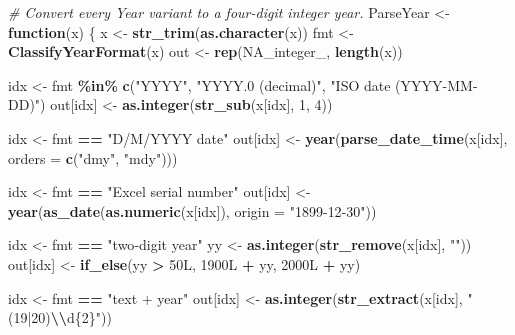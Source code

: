 \documentclass[
]{article}
\newenvironment{Shaded}{\begin{snugshade}}{\end{snugshade}}
\newcommand{\AttributeTok}[1]{\textcolor[rgb]{0.13,0.29,0.53}{#1}}
\newcommand{\CommentTok}[1]{\textcolor[rgb]{0.56,0.35,0.01}{\textit{#1}}}
\newcommand{\ConstantTok}[1]{\textcolor[rgb]{0.56,0.35,0.01}{#1}}
\newcommand{\ControlFlowTok}[1]{\textcolor[rgb]{0.13,0.29,0.53}{\textbf{#1}}}
\newcommand{\DataTypeTok}[1]{\textcolor[rgb]{0.13,0.29,0.53}{#1}}
\newcommand{\DecValTok}[1]{\textcolor[rgb]{0.00,0.00,0.81}{#1}}
\newcommand{\FunctionTok}[1]{\textcolor[rgb]{0.13,0.29,0.53}{\textbf{#1}}}
\newcommand{\NormalTok}[1]{#1}
\newcommand{\OtherTok}[1]{\textcolor[rgb]{0.56,0.35,0.01}{#1}}
\newcommand{\SpecialCharTok}[1]{\textcolor[rgb]{0.81,0.36,0.00}{\textbf{#1}}}
\newcommand{\StringTok}[1]{\textcolor[rgb]{0.31,0.60,0.02}{#1}}
\begin{document}
\begin{Shaded}
\begin{Highlighting}[]
\CommentTok{\# Convert every Year variant to a four{-}digit integer year.}
\NormalTok{ParseYear }\OtherTok{\textless{}{-}} \ControlFlowTok{function}\NormalTok{(x) \{}
\NormalTok{  x }\OtherTok{\textless{}{-}} \FunctionTok{str\_trim}\NormalTok{(}\FunctionTok{as.character}\NormalTok{(x))}
\NormalTok{  fmt }\OtherTok{\textless{}{-}} \FunctionTok{ClassifyYearFormat}\NormalTok{(x)}
\NormalTok{  out }\OtherTok{\textless{}{-}} \FunctionTok{rep}\NormalTok{(}\ConstantTok{NA\_integer\_}\NormalTok{, }\FunctionTok{length}\NormalTok{(x))}

\NormalTok{  idx }\OtherTok{\textless{}{-}}\NormalTok{ fmt }\SpecialCharTok{\%in\%} \FunctionTok{c}\NormalTok{(}\StringTok{"YYYY"}\NormalTok{, }\StringTok{"YYYY.0 (decimal)"}\NormalTok{, }\StringTok{"ISO date (YYYY{-}MM{-}DD)"}\NormalTok{)}
\NormalTok{  out[idx] }\OtherTok{\textless{}{-}} \FunctionTok{as.integer}\NormalTok{(}\FunctionTok{str\_sub}\NormalTok{(x[idx], }\DecValTok{1}\NormalTok{, }\DecValTok{4}\NormalTok{))}

\NormalTok{  idx }\OtherTok{\textless{}{-}}\NormalTok{ fmt }\SpecialCharTok{==} \StringTok{"D/M/YYYY date"}
\NormalTok{  out[idx] }\OtherTok{\textless{}{-}} \FunctionTok{year}\NormalTok{(}\FunctionTok{parse\_date\_time}\NormalTok{(x[idx], }\AttributeTok{orders =} \FunctionTok{c}\NormalTok{(}\StringTok{"dmy"}\NormalTok{, }\StringTok{"mdy"}\NormalTok{)))}

\NormalTok{  idx }\OtherTok{\textless{}{-}}\NormalTok{ fmt }\SpecialCharTok{==} \StringTok{"Excel serial number"}
\NormalTok{  out[idx] }\OtherTok{\textless{}{-}} \FunctionTok{year}\NormalTok{(}\FunctionTok{as\_date}\NormalTok{(}\FunctionTok{as.numeric}\NormalTok{(x[idx]), }\AttributeTok{origin =} \StringTok{"1899{-}12{-}30"}\NormalTok{))}

\NormalTok{  idx }\OtherTok{\textless{}{-}}\NormalTok{ fmt }\SpecialCharTok{==} \StringTok{"two{-}digit year"}
\NormalTok{  yy }\OtherTok{\textless{}{-}} \FunctionTok{as.integer}\NormalTok{(}\FunctionTok{str\_remove}\NormalTok{(x[idx], }\StringTok{"\textquotesingle{}"}\NormalTok{))}
\NormalTok{  out[idx] }\OtherTok{\textless{}{-}} \FunctionTok{if\_else}\NormalTok{(yy }\SpecialCharTok{\textgreater{}} \DecValTok{50}\DataTypeTok{L}\NormalTok{, }\DecValTok{1900}\DataTypeTok{L} \SpecialCharTok{+}\NormalTok{ yy, }\DecValTok{2000}\DataTypeTok{L} \SpecialCharTok{+}\NormalTok{ yy)}

\NormalTok{  idx }\OtherTok{\textless{}{-}}\NormalTok{ fmt }\SpecialCharTok{==} \StringTok{"text + year"}
\NormalTok{  out[idx] }\OtherTok{\textless{}{-}} \FunctionTok{as.integer}\NormalTok{(}\FunctionTok{str\_extract}\NormalTok{(x[idx], }\StringTok{"(19|20)}\SpecialCharTok{\textbackslash{}\textbackslash{}}\StringTok{d\{2\}"}\NormalTok{))}


\end{Highlighting}
\end{Shaded}
\end{document}
